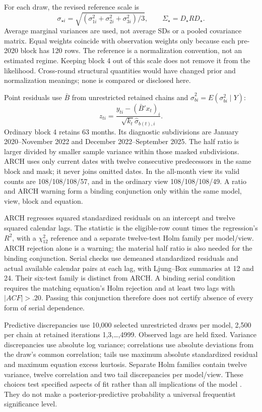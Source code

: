 \documentclass[11pt,a4paper]{article}
\begin{document}
For each draw, the revised reference scale is
\[
 \sigma_{\star i}=\sqrt{(\sigma_{1i}^2+\sigma_{2i}^2+\sigma_{3i}^2)/3},
 \qquad \Sigma_\star=D_\star RD_\star.
\]
Average marginal variances are used, not average SDs or a pooled covariance matrix. Equal weights coincide with observation weights only because each pre-2020 block has 120 rows. The reference is a normalization convention, not an estimated regime. Keeping block 4 out of this scale does not remove it from the likelihood. Cross-round structural quantities would have changed prior and normalization meanings; none is compared or disclosed here.

Point residuals use $\bar B$ from unrestricted retained chains and $\hat\sigma_{bi}^2=E(\sigma_{bi}^2\mid Y)$:
\[
 z_{ti}=\frac{y_{ti}-(\bar B'x_t)_i}{\sqrt{k_t}\hat\sigma_{b(t),i}}.
\]
Ordinary block 4 retains 63 months. Its diagnostic subdivisions are January 2020--November 2022 and December 2022--September 2025. The half ratio is larger divided by smaller sample variance within those masked subdivisions. ARCH uses only current dates with twelve consecutive predecessors in the same block and mask; it never joins omitted dates. In the all-month view its valid counts are 108/108/108/57, and in the ordinary view 108/108/108/49. A ratio and ARCH warning form a binding conjunction only within the same model, view, block and equation.

ARCH regresses squared standardized residuals on an intercept and twelve squared calendar lags. The statistic is the eligible-row count times the regression's $R^2$, with a $\chi^2_{12}$ reference and a separate twelve-test Holm family per model/view. ARCH rejection alone is a warning; the material half ratio is also needed for the binding conjunction. Serial checks use demeaned standardized residuals and actual available calendar pairs at each lag, with Ljung--Box summaries at 12 and 24. Their six-test family is distinct from ARCH. A binding serial condition requires the matching equation's Holm rejection and at least two lags with $|ACF|>.20$. Passing this conjunction therefore does not certify absence of every form of serial dependence.

Predictive discrepancies use 10,000 selected unrestricted draws per model, 2,500 per chain at retained iterations 1,3,\ldots,4999. Observed lags are held fixed. Variance discrepancies use absolute log variance; correlations use absolute deviations from the draw's common correlation; tails use maximum absolute standardized residual and maximum equation excess kurtosis. Separate Holm families contain twelve variance, twelve correlation and two tail discrepancies per model/view. These choices test specified aspects of fit rather than all implications of the model \cite{gms1996}. They do not make a posterior-predictive probability a universal frequentist significance level.
\end{document}
